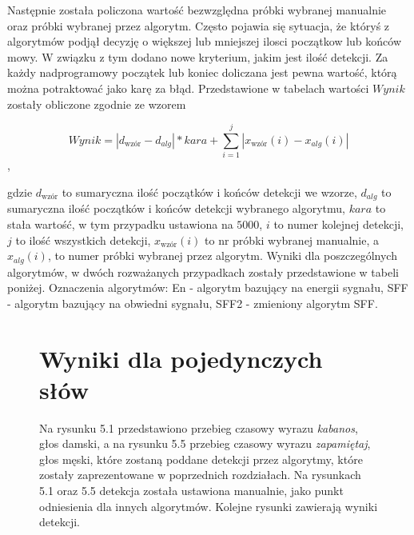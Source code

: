 \documentclass[eng,printmode]{mgr}
\begin{document}
 Następnie została policzona wartość bezwzględna próbki wybranej manualnie oraz próbki wybranej przez algorytm. Często pojawia się sytuacja, że któryś z algorytmów podjął decyzję o większej lub mniejszej ilosci początkow lub końców mowy. W związku z tym dodano nowe kryterium, jakim jest ilość detekcji. Za każdy nadprogramowy początek lub koniec doliczana jest pewna wartość, którą można potraktować jako karę za błąd. Przedstawione w tabelach wartości $Wynik$ zostały obliczone zgodnie ze wzorem 
 
 $$Wynik = |d_{\textrm{wzór}} - d_{alg}|*kara + \sum_{i=1}^{j}| x_{\textrm{wzór}}(i)-x_{alg}(i) |$$, 
 
 gdzie $d_{\textrm{wzór}}$ to sumaryczna ilość początków i końców detekcji we wzorze, $d_{alg}$ to sumaryczna ilość początków i końców detekcji wybranego algorytmu, $kara$ to stała wartość, w tym przypadku ustawiona na $5000$, $i$ to numer kolejnej detekcji, $j$ to ilość wszystkich detekcji, $x_{\textrm{wzór}}(i)$ to nr próbki wybranej manualnie, a $x_{alg}(i)$, to numer próbki wybranej przez algorytm. Wyniki dla poszczególnych algorytmów, w dwóch rozważanych przypadkach zostały przedstawione w tabeli poniżej. Oznaczenia algorytmów: En - algorytm bazujący na energii sygnału, SFF - algorytm bazujący na obwiedni sygnału, SFF2 - zmieniony algorytm SFF.

\begin{figure}
\section{Wyniki dla pojedynczych słów}
	Na rysunku 5.1 przedstawiono przebieg czasowy wyrazu \emph{kabanos}, głos damski, a na rysunku 5.5 przebieg czasowy wyrazu \emph{zapamiętaj}, głos męski, które zostaną poddane detekcji przez algorytmy, które zostały zaprezentowane w poprzednich rozdziałach. Na rysunkach 5.1 oraz 5.5 detekcja została ustawiona manualnie, jako punkt odniesienia dla innych algorytmów.
	Kolejne rysunki zawierają wyniki detekcji.
\end{figure}
\end{document}
